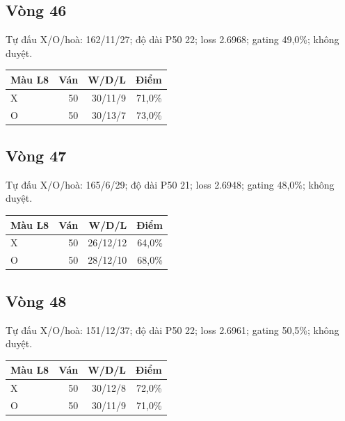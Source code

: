 \subsection*{Vòng 46}

Tự đấu X/O/hoà: 162/11/27; độ dài P50 22; loss 2.6968; gating 49,0\%; không duyệt.

\begin{center}\scriptsize\begin{tabular}{@{}lrrr@{}}\toprule

Màu L8 & Ván & W/D/L & Điểm \\

\midrule

X & 50 & 30/11/9 & 71,0\% \\

O & 50 & 30/13/7 & 73,0\% \\

\bottomrule\end{tabular}\end{center}

\subsection*{Vòng 47}

Tự đấu X/O/hoà: 165/6/29; độ dài P50 21; loss 2.6948; gating 48,0\%; không duyệt.

\begin{center}\scriptsize\begin{tabular}{@{}lrrr@{}}\toprule

Màu L8 & Ván & W/D/L & Điểm \\

\midrule

X & 50 & 26/12/12 & 64,0\% \\

O & 50 & 28/12/10 & 68,0\% \\

\bottomrule\end{tabular}\end{center}

\subsection*{Vòng 48}

Tự đấu X/O/hoà: 151/12/37; độ dài P50 22; loss 2.6961; gating 50,5\%; không duyệt.

\begin{center}\scriptsize\begin{tabular}{@{}lrrr@{}}\toprule

Màu L8 & Ván & W/D/L & Điểm \\

\midrule

X & 50 & 30/12/8 & 72,0\% \\

O & 50 & 30/11/9 & 71,0\% \\

\bottomrule\end{tabular}\end{center}

